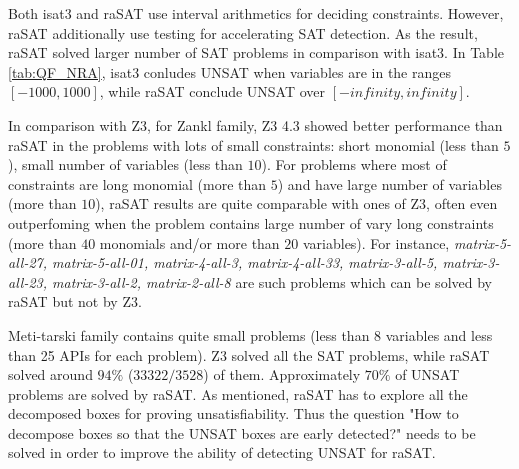\documentclass[runningheads,a4paper,oribibl]{llncs}
\begin{document}
Both isat3 and raSAT use interval arithmetics for deciding constraints. However, raSAT additionally use testing for accelerating SAT detection. As the result, raSAT solved larger number of SAT problems in comparison with isat3. In Table \ref{tab:QF_NRA}, isat3 conludes UNSAT when variables are in the ranges $[-1000, 1000]$, while raSAT conclude UNSAT over $[-infinity, infinity]$.


In comparison with Z3, for Zankl family, Z3 4.3 showed better performance than raSAT in the problems with lots of small constraints: short monomial (less than $5$), small number of variables (less than $10$). For problems where most of constraints are long monomial (more than $5$) and have large number of variables (more than $10$), raSAT results are quite comparable with ones of Z3, often even outperfoming when the problem contains large number of vary long constraints (more than $40$ monomials and/or more than $20$ variables). For instance, \textit{matrix-5-all-27, matrix-5-all-01, matrix-4-all-3, matrix-4-all-33, matrix-3-all-5, matrix-3-all-23, matrix-3-all-2, matrix-2-all-8} are such problems which can be solved by raSAT but not by Z3.

Meti-tarski family contains quite small problems (less than 8 variables and less than 25 APIs for each problem). Z3 solved all the SAT problems, while raSAT solved around $94\%$ ($33322/3528$) of them. Approximately $70\%$ of UNSAT problems are solved by raSAT. As mentioned, raSAT has to explore all the decomposed boxes for proving unsatisfiability. Thus the question "How to decompose boxes so that the UNSAT boxes are early detected?" needs to be solved in order to improve the ability of detecting UNSAT for raSAT.
\begin{table*}[t]
\centering
{}
\medskip
\caption{Experimental results for Hong, Zankl, and Meti-Tarski families}
\label{tab:QF_NRA}
\end{table*}
\end{document}
